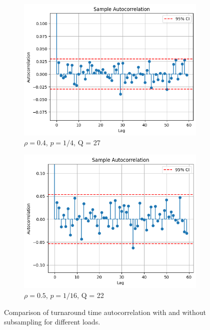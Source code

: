 \begin{figure}[H]
    \begin{subfigure}[b]{0.45\textwidth}
        \includegraphics[width=\textwidth]{./images/04/autoCor/autoCorLowFix.png}
        \caption{$\rho=0.4$, $p=1/4$, Q = 27}
        \label{fig:autoCorLowFix}
    \end{subfigure}
    \hfill %
    \begin{subfigure}[b]{0.45\textwidth}
        \includegraphics[width=\textwidth]{./images/04/autoCor/autoCorHighFix.png}
        \caption{$\rho=0.5$, $p=1/16$, Q = 22}
        \label{fig:autoCorHighFix}
    \end{subfigure}
    \vspace{10pt} %
    \caption{Comparison of turnaround time autocorrelation with and without subsampling for different loads.}
    \label{fig:autoCorComparison}
\end{figure}
